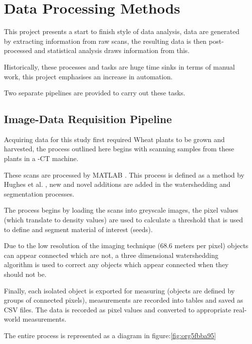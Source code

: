 \documentclass[11pt]{report}
\begin{document}
\section{Data Processing Methods}
\label{sec:org6409d2e}
This project presents a start to finish style of data analysis, data are generated by extracting information from raw scans, the resulting data is then post-processed and statistical analysis draws information from this.

Historically, these processes and tasks are huge time sinks in terms of manual work, this project emphasises an increase in automation.

Two separate pipelines are provided to carry out these tasks.

\subsection{Image-Data Requisition Pipeline}
\label{sec:org6070485}

Acquiring data for this study first required Wheat plants to be grown and harvested, the process outlined here begins with scanning samples from these plants in a \textmu{}-CT machine.

These scans are processed by MATLAB \cite{MATHWORKS2017}. This process is defined as a method by Hughes et al. \cite{Hughes2017}, new and novel additions are added in the watershedding and segmentation processes.

The process begins by loading the scans into greyscale images, the pixel values (which translate to density values) are used to calculate a threshold that is used to define and segment material of interest (seeds).

Due to the low resolution of the imaging technique (68.6\textmu{} meters per pixel) objects can appear connected which are not, a three dimensional watershedding algorithm is used to correct any objects which appear connected when they should not be.

Finally, each isolated object is exported for measuring (objects are defined by groups of connected pixels), measurements are recorded into tables and saved as CSV files. The data is recorded as pixel values and converted to appropriate real-world measurements.

The entire process is represented as a diagram in figure:\ref{fig:org5fbba95}
\end{document}
